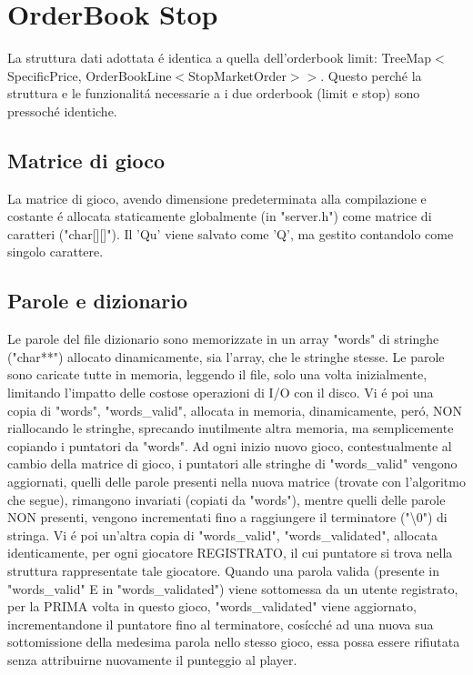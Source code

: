  \section{OrderBook Stop}
La struttura dati adottata \'e identica a quella dell'orderbook limit: TreeMap\(<\)SpecificPrice, OrderBookLine\(<\)StopMarketOrder\(>>\). Questo perch\'e la struttura e le funzionalit\'a necessarie a i due orderbook (limit e stop) sono pressoch\'e identiche.
 
\subsection{Matrice di gioco}

La matrice di gioco, avendo dimensione predeterminata alla compilazione e costante \'e allocata staticamente globalmente (in "server.h") come matrice di caratteri ("char[][]"). Il 'Qu' viene salvato come 'Q', ma gestito contandolo come singolo carattere.
\\

\subsection{Parole e dizionario}

Le parole del file dizionario sono memorizzate in un array "words" di stringhe ("char**") allocato dinamicamente, sia l'array, che le stringhe stesse. Le parole sono caricate tutte in memoria, leggendo il file, solo una volta inizialmente, limitando l'impatto delle costose operazioni di I/O con il disco. Vi \'e poi una copia di "words", "words\_valid", allocata in memoria, dinamicamente, per\'o, NON riallocando le stringhe, sprecando inutilmente altra memoria, ma semplicemente copiando i puntatori da "words". Ad ogni inizio nuovo gioco, contestualmente al cambio della matrice di gioco, i puntatori alle stringhe di "words\_valid" vengono aggiornati, quelli delle parole presenti nella nuova matrice (trovate con l'algoritmo che segue), rimangono invariati (copiati da "words"), mentre quelli delle parole NON presenti, vengono incrementati fino a raggiungere il terminatore ("\textbackslash0") di stringa. Vi \'e poi un'altra copia di "words\_valid", "words\_validated", allocata identicamente, per ogni giocatore REGISTRATO, il cui puntatore si trova nella struttura rappresentate tale giocatore. Quando una parola valida (presente in "words\_valid" E in "words\_validated") viene sottomessa da un utente registrato, per la PRIMA volta in questo gioco, "words\_validated" viene aggiornato, incrementandone il puntatore fino al terminatore, cos\'icch\'e ad una nuova sua sottomissione della medesima parola nello stesso gioco, essa possa essere rifiutata senza attribuirne nuovamente il punteggio al player.
\\

